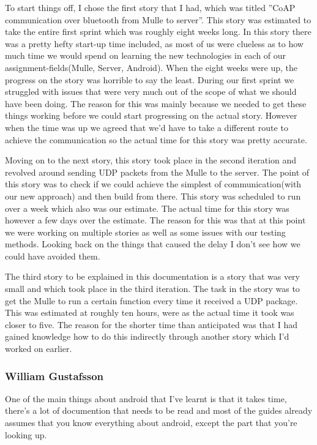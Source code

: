 To start things off, I chose the first story that I had, which was titled ''CoAP communication over bluetooth from Mulle to server''.
This story was estimated to take the entire first sprint which was roughly eight weeks long. In this story there was a pretty hefty start-up time included, 
as most of us were clueless as to how much time we would spend on learning the new technologies in each of our assignment-fields(Mulle, Server, Android).
When the eight weeks were up, the progress on the story was horrible to say the least. During our first sprint we struggled with issues that were very much 
out of the scope of what we should have been doing. The reason for this was mainly because we needed to get these things working before we could start progressing on the actual story.
However when the time was up we agreed that we'd have to take a different route to achieve the communication so the actual time for this story was pretty accurate.

Moving on to the next story, this story took place in the second iteration and revolved around sending UDP packets from the Mulle to the server.
The point of this story was to check if we could achieve the simplest of communication(with our new approach) and then build from there. This story was scheduled to run over 
a week  which also was our estimate. The actual time for this story was however a few days over the estimate. The reason for this was that at this point we were working on multiple stories as
well as some issues with our testing methods. Looking back on the things that caused the delay I don't see how we could have avoided them.

The third story to be explained in this documentation is a story that was very small and which took place in the third iteration.
The task in the story was to get the Mulle to run a certain function every time it received a UDP package. This was estimated at roughly ten hours, 
were as the actual time it took was closer to five. The reason for the shorter time than anticipated was that I had gained knowledge how to do this 
indirectly through another story which I'd worked on earlier.

\subsubsection{William Gustafsson}
One of the main things about android that I've learnt is that it takes time, 
there's a lot of documention that needs to be read and most of the guides already assumes that you know everything about android, except the part that you're looking up.

